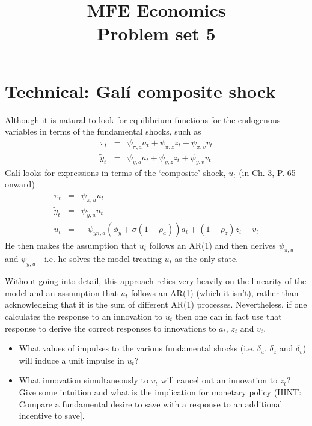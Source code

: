 \documentclass[authoryear,11pt]{elsarticle}
\begin{document}
\begin{frontmatter}
\title{MFE Economics\\Problem set 5}
\end{frontmatter}


\section{Technical: Gal\'i composite shock}
Although it is natural to look for equilibrium functions for the endogenous variables in terms of the fundamental shocks, such as
\begin{eqnarray*}
\pi_{t} 		&=& \psi_{\pi,a} a_{t} + \psi_{\pi,z} z_{t} + \psi_{\pi,v} v_{t} \\
\tilde{y}_{t} &=& \psi_{\tilde{y},a} a_{t} + \psi_{\tilde{y},z} z_{t} + \psi_{\tilde{y},v} v_{t}
\end{eqnarray*}
Gal\'i looks for expressions in terms of the `composite' shock, $u_{t}$ (in Ch. 3, P. 65 onward)
\begin{eqnarray*}
\pi_{t} 		&=& \psi_{\pi,u} u_{t} \\
\tilde{y}_{t} &=& \psi_{\tilde{y},u} u_{t} \\
u_{t}		&=& -\psi_{yn,a}\left( \phi_{y} + \sigma(1-\rho_{a}) \right)a_{t} + (1-\rho_{z})z_{t} - v_{t}
\end{eqnarray*}
He then makes the assumption that $u_{t}$ follows an AR(1) and then derives $\psi_{\pi,u}$ and $\psi_{\tilde{y},u}$ - i.e. he solves the model treating $u_{t}$ as the only state.

Without going into detail, this approach relies very heavily on the linearity of the model and an assumption that $u_{t}$ follows an AR(1) (which it isn't), rather than acknowledging that it is the sum of different AR(1) processes. Nevertheless, if one calculates the response to an innovation to $u_{t}$ then one can in fact use that response to derive the correct responses to innovations to $a_{t}$, $z_{t}$ and $v_{t}$.
\begin{itemize}
\item	What values of impulses to the various fundamental shocks (i.e. $\delta_{a}$, $\delta_{z}$ and $\delta_{v}$) will induce a unit impulse in $u_{t}$?
\item	What innovation simultaneously to $v_{t}$ will cancel out an innovation to $z_{t}$? Give some intuition and what is the implication for monetary policy (HINT: Compare a fundamental desire to save with a response to an additional incentive to save].
\end{itemize}
\end{document}
